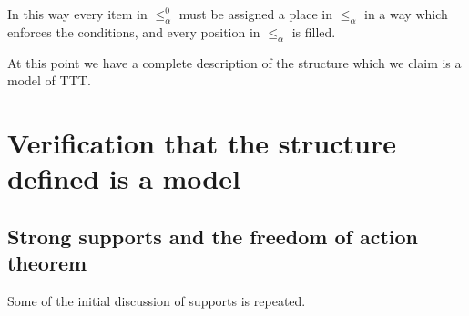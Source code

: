 \documentclass[112pt]{article}
\begin{document}
\begin{description}
In this way every item in $\leq_\alpha^0$  must be assigned a place in $\leq_\alpha$ in a way which enforces the conditions, and every position in $\leq_\alpha$ is filled.

\begin{comment}

NOTE TO SELF:  write out the back and forth argument in more detail for communication with Sky

\end{comment}

At this point we have a complete description of the structure which we claim is a model of TTT.


\end{description}

\section{Verification that the structure defined is a model}

\subsection{Strong supports and the freedom of action theorem}

Some of the initial discussion of supports is repeated.
\end{document}
